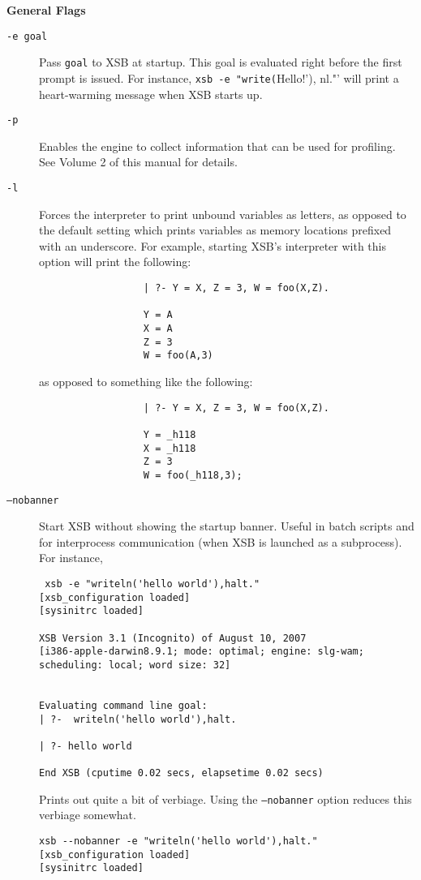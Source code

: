 \begin{description}
\item {\bf General Flags}
\begin{description}
\item[{\tt -e goal}] Pass {\tt goal}  to XSB at startup. This goal is evaluated
    right before the first prompt is issued. For instance, 
    \verb'xsb -e "write('Hello!'), nl."'
    will print a heart-warming message when XSB starts up.
%
\item[{\tt -p}] Enables the engine to collect information that can be
  used for profiling.  See Volume 2 of this manual for details.
%
\item[{\tt -l}] Forces the interpreter to print unbound variables as
	letters, as opposed to the default setting which prints
	variables as memory locations prefixed with an underscore.
	For example, starting XSB's interpreter with this option will
	print the following:
        \begin{verbatim}
                  | ?- Y = X, Z = 3, W = foo(X,Z).

                  Y = A
                  X = A
                  Z = 3
                  W = foo(A,3)
	\end{verbatim}
	as opposed to something like the following:
	\begin{verbatim}
                  | ?- Y = X, Z = 3, W = foo(X,Z).

                  Y = _h118
                  X = _h118
                  Z = 3
                  W = foo(_h118,3);
	\end{verbatim}
  \item[{\tt --nobanner}] Start XSB without showing the startup banner.
    Useful in batch scripts and for interprocess communication (when XSB is
    launched as a subprocess).  For instance, 
\begin{verbatim}
 xsb -e "writeln('hello world'),halt."
[xsb_configuration loaded]
[sysinitrc loaded]

XSB Version 3.1 (Incognito) of August 10, 2007
[i386-apple-darwin8.9.1; mode: optimal; engine: slg-wam; scheduling: local; word size: 32]


Evaluating command line goal:  
| ?-  writeln('hello world'),halt.

| ?- hello world

End XSB (cputime 0.02 secs, elapsetime 0.02 secs)
\end{verbatim}
Prints out quite a bit of verbiage.  Using the {\tt --nobanner} option
reduces this verbiage somewhat.
\begin{verbatim}
xsb --nobanner -e "writeln('hello world'),halt."
[xsb_configuration loaded]
[sysinitrc loaded]


\end{verbatim}
\end{description}
\end{description}
